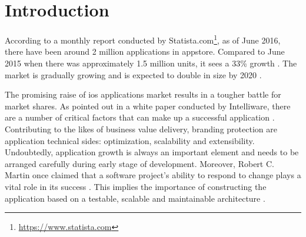 \documentclass[11pt,a4paper,oneside,article]{memoir}
\begin{document}
\setcounter{page}{1} %
\ClearWallPaper

\sloppy %

\chapter{Introduction}\label{introduction}
According to a monthly report conducted by Statista.com\footnote{\url{https://www.statista.com}}, as of June 2016, there have been around 2 million applications in \gls{appstore}\cite{market:prediction}. Compared to June 2015 when there was approximately 1.5 million units, it sees a 33\% growth \cite{statista:num_app}. The market is gradually growing and is expected to double in size by 2020 \cite{market:report}.


    
 
The promising raise of \gls{ios} applications market results in a tougher battle for market shares. As pointed out in a white paper conducted by Intelliware, there are a number of critical factors that can make up a successful application \cite{intelliware:success}. Contributing to the likes of business value delivery, branding protection are application technical sides: optimization, scalability and extensibility. Undoubtedly, application growth is always an important element and needs to be arranged carefully during early stage of development. Moreover, Robert C. Martin once claimed that a software project's ability to respond to change plays a vital role in its success \cite[p.32]{unclebob:agile}. This implies the importance of constructing the application based on a testable, scalable and maintainable architecture \cite{architecture:architecsolution}.
\end{document}
